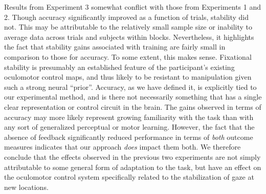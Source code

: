 Results from Experiment 3 somewhat conflict with those from Experiments 1 and 2. Though accuracy significantly improved as a function of trials, stability did not. This may be attributable to the relatively small sample size or inability to average data across trials and subjects within blocks. Nevertheless, it highlights the fact that stability gains associated with training  are fairly small in comparison to those for accuracy. To some extent, this makes sense. Fixational stability is presumably an established feature of the participant's existing oculomotor control maps, and thus likely to be resistant to manipulation given such a strong neural ``prior''. Accuracy, as we have defined it, is explicitly tied to our experimental method, and is there not necessarily something that has a single clear representation or control circuit in the brain. The gains observed in terms of accuracy may more likely represent growing familiarity with the task than with any sort of generalized perceptual or motor learning. However, the fact that the absence of feedback significantly reduced performance in terms of \textit{both} outcome measures indicates that our approach \textit{does} impact them both. We therefore conclude that the effects observed in the previous two experiments are not simply attributable to some general form of adaptation to the task, but have an effect on the oculomotor control system specifically related to the stabilization of gaze at new locations. 
